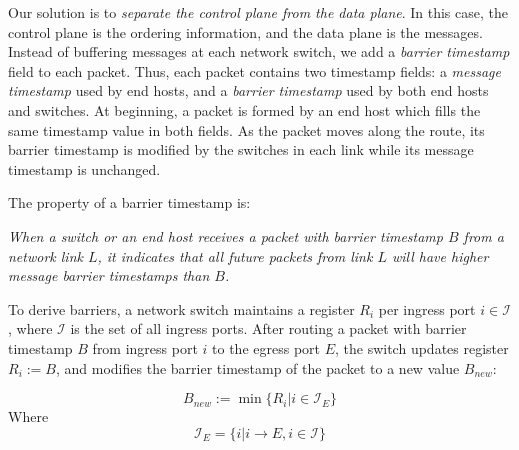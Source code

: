 Our solution is to \textit{separate the control plane from the data plane}.
{In this case, the control plane is the ordering information, and the data plane is the messages.
Instead of buffering messages at each network switch, we add a \textit{barrier timestamp} field to each packet.
Thus, each packet contains two timestamp fields: a \textit{message timestamp} used by end hosts, and a \textit{barrier timestamp} used by both end hosts and switches. 
At beginning, a packet is formed by an end host which fills the same timestamp value in both fields.
As the packet moves along the route,  its barrier timestamp is modified by the switches in each link while its message timestamp is unchanged.}

The property of a barrier timestamp is: 

\emph{When a switch or an end host receives a packet with barrier timestamp $B$ from a network link $L$, it indicates that all future packets from link $L$ will have higher message  barrier timestamps than $B$.}

To derive barriers,  a network switch maintains a register $R_i$ per ingress port $i \in \mathcal{I}$, where $\mathcal{I}$ is the set of all ingress ports.
After routing a packet with barrier timestamp $B$ from ingress port $i$ to the egress port $E$, the switch updates register $R_i := B$, and modifies the barrier timestamp of the packet to a new value $B_{new}$:

\begin{equation}\label{equ:derive_barriers}
B_{new}:=\min\{R_i| i\in \mathcal{I}_E\}
\end{equation}
Where 
\begin{equation}\label{equ:derive_barriers1}
\mathcal{I}_E =\{i| i\rightarrow E, i \in \mathcal{I} \}
\end{equation}

